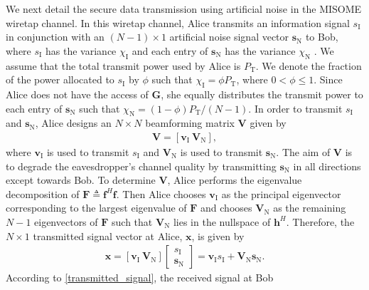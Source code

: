 \documentclass[journal]{IEEEtran}
\begin{document}
We next detail the secure data transmission using artificial noise
in the MISOME wiretap channel. In this wiretap channel, Alice
transmits an information signal $s_{\textrm{I}}$ in conjunction with
an $\left(N-1\right)\times1$ artificial noise signal vector
$\mathbf{s}_{\textrm{N}}$ to Bob, where $s_{\textrm{I}}$ has the
variance $\chi_{\textrm{I}}$ and each entry of
$\mathbf{s}_{\textrm{N}}$ has the variance $\chi_{\textrm{N}}$
\cite{Zhou}. We assume that the total transmit power used by Alice
is $P_{\textrm{T}}$. We denote the fraction of the power allocated
to $s_{\textrm{I}}$ by $\phi$ such that
$\chi_{\textrm{I}}=\phi{}P_{\textrm{T}}$, where $0<\phi\leq{}1$.
Since Alice does not have the access of $\mathbf{G}$, she equally
distributes the transmit power to each entry of
$\mathbf{s}_{\textrm{N}}$ such that
$\chi_{\textrm{N}}=\left(1-\phi\right)P_{\textrm{T}}/\left(N-1\right)$.
In order to transmit $s_{\textrm{I}}$ and $\mathbf{s}_{\textrm{N}}$,
Alice designs an $N\times{}N$ beamforming matrix $\mathbf{V}$ given
by
\begin{align}\label{beamforming_matrix}
\mathbf{V}=\left[\textbf{v}_{\textrm{I}}~\textbf{V}_{\textrm{N}}\right],
\end{align}
where $\textbf{v}_{\textrm{I}}$ is used to transmit $s_{\textrm{I}}$
and $\textbf{V}_{\textrm{N}}$ is used to transmit
$\mathbf{s}_{\textrm{N}}$. The aim of $\mathbf{V}$ is to degrade the
eavesdropper's channel quality by transmitting
$\mathbf{s}_{\textrm{N}}$ in all directions except towards Bob. To
determine $\mathbf{V}$, Alice performs the eigenvalue decomposition
of $\mathbf{F}\triangleq\mathbf{f}^{H}\mathbf{f}$. Then Alice
chooses $\textbf{v}_{\textrm{I}}$ as the principal eigenvector
corresponding to the largest eigenvalue of $\mathbf{F}$ and chooses
$\textbf{V}_{\textrm{N}}$ as the remaining $N-1$ eigenvectors of
$\mathbf{F}$ such that $\textbf{V}_{\textrm{N}}$ lies in the
nullspace of $\textbf{h}^{H}$. Therefore, the $N\times1$ transmitted
signal vector at Alice, $\mathbf{x}$, is given by
\begin{align}\label{transmitted_signal}
\mathbf{x}=\left[\textbf{v}_{\textrm{I}}~\textbf{V}_{\textrm{N}}\right]\left[\begin{array}{c}
s_{\textrm{I}}\\
\mathbf{s}_{\textrm{N}}\end{array}\right]
=\textbf{v}_{\textrm{I}}s_{\textrm{I}}+\textbf{V}_{\textrm{N}}\mathbf{s}_{\textrm{N}}.
\end{align}
According to \eqref{transmitted_signal}, the received signal at Bob
\end{document}
